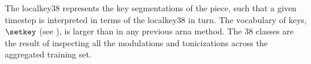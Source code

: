 
The \gls{localkey38} represents the key segmentations of the
piece, such that a given timestep is interpreted in terms of
the \gls{localkey38} in turn. 
The vocabulary of keys, $\setkey$ (see
), is larger than in any
previous \gls{arna} method. The 38 classes are the result of
inspecting all the modulations and tonicizations across the
aggregated training set.
